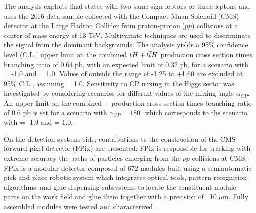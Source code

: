 The analysis exploits final states with two same-sign leptons or three leptons and uses the 2016 data sample collected with the Compact Muon Solenoid (CMS) detector at the Large Hadron Collider from proton-proton ($pp$) collisions at a center of mass-energy of 13 TeV. Multivariate techniques are used to discriminate the signal from the dominant backgrounds. The analysis yields a 95\% confidence level (C.L.) upper limit on the combined ${tH + t\bar{t}H}$ production cross section times branching ratio of 0.64 pb, with an expected limit of 0.32 pb, for a scenario with \Ct = -1.0 and \CV = 1.0. Values of \Ct outside the range of -1.25 to +1.60 are excluded at 95\% C.L., assuming \CV = 1.0. Sensitivity to CP mixing in the Higgs sector was investigated by considering scenarios for different values of the mixing angle $\alpha_{CP}$. An upper limit on the combined \tH + \ttH production cross section times branching ratio of 0.6 pb is set for a scenario with $\alpha_{CP}=180^\circ$ which corresponds to the scenario with \Ct = -1.0 and \CV = 1.0.

On the detection systems side, contributions to the construction of the CMS forward pixel detector (FPix) are presented; FPix is responsible for tracking with extreme accuracy the paths of particles emerging from the $pp$ collisions at CMS. FPix is a modular detector composed of 672 modules built using a semiautomatic pick-and-place robotic system which integrates optical tools, pattern recognition algorithms, and glue dispensing subsystems to locate the constituent module parts on the work field and glue them together with a precision of ~10 $\mu$m. Fully assembled modules were tested and characterized.
